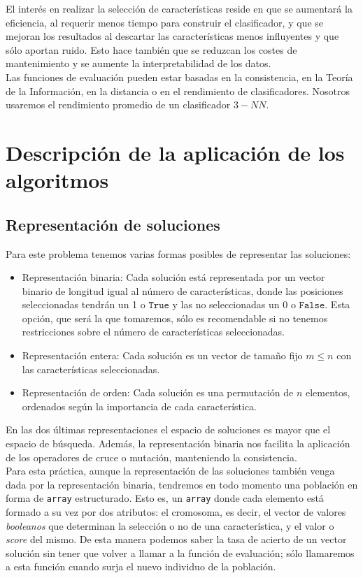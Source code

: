 \documentclass[11pt,leqno]{article}
\begin{document}
El interés en realizar la selección de características reside en que se aumentará la eficiencia, al requerir menos tiempo para construir el clasificador, y que se mejoran los resultados al descartar las características menos influyentes y que sólo aportan ruido. Esto hace también que se reduzcan los costes de mantenimiento y se aumente la interpretabilidad de los datos.\\
Las funciones de evaluación pueden estar basadas en la consistencia, en la Teoría de la Información, en la distancia o en el rendimiento de clasificadores. Nosotros usaremos el rendimiento promedio de un clasificador $3-NN$.


\section{Descripción de la aplicación de los algoritmos}
\subsection{Representación de soluciones}
	Para este problema tenemos varias formas posibles de representar las soluciones:
	\begin{itemize}
		\item Representación binaria: Cada solución está representada por un vector binario de longitud igual al número de características, donde las posiciones seleccionadas tendrán un 1 o $\texttt{True}$ y las no seleccionadas un 0 o $\texttt{False}$. Esta opción, que será la que tomaremos, sólo es recomendable si no tenemos restricciones sobre el número de características seleccionadas.
		\item Representación entera: Cada solución es un vector de tamaño fijo $m \leq n$ con las características seleccionadas.
		\item Representación de orden: Cada solución es una permutación de $n$ elementos, ordenados según la importancia de cada característica.
	\end{itemize}
	En las dos últimas representaciones el espacio de soluciones es mayor que el espacio de búsqueda. Además, la representación binaria nos facilita la aplicación de los operadores de cruce o mutación, manteniendo la consistencia.\\
	Para esta práctica, aunque la representación de las soluciones también venga dada por la representación binaria, tendremos en todo momento una población en forma de \texttt{array} estructurado. Esto es, un \texttt{array} donde cada elemento está formado a su vez por dos atributos: el cromosoma, es decir, el vector de valores \textit{booleanos} que determinan la selección o no de una característica, y el valor o \textit{score} del mismo. De esta manera podemos saber la tasa de acierto de un vector solución sin tener que volver a llamar a la función de evaluación; sólo llamaremos a esta función cuando surja el nuevo individuo de la población.
\end{document}
